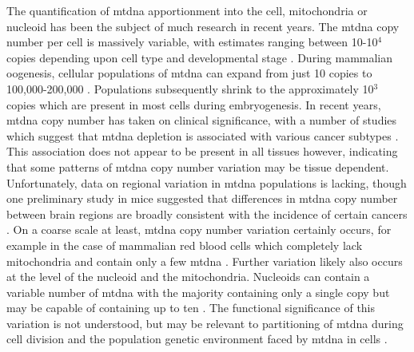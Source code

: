\documentclass[12pt,twoside]{reedthesis}
\begin{document}
The quantification of \gls{mtdna} apportionment into the cell, mitochondria or nucleoid has been the subject of much research in recent years. 
The \gls{mtdna} copy number per cell is massively variable, with estimates ranging between 10-10$^{4}$ copies depending upon cell type and developmental stage \citep{shuster_mitochondrial_1988, white_revealing_2008}.
During mammalian oogenesis, cellular populations of \gls{mtdna} can expand from just 10 copies to 100,000-200,000 \citep{cao_mitochondrial_2007, shoubridge_mitochondrial_2007, white_revealing_2008}.
Populations subsequently shrink to the approximately 10$^{3}$ copies which are present in most cells during embryogenesis.
In recent years, \gls{mtdna} copy number has taken on clinical significance, with a number of studies which suggest that \gls{mtdna} depletion is associated with various cancer subtypes \citep{thyagarajan_mitochondrial_2012, thyagarajan_mitochondrial_2013, zhou_peripheral_2014, el-hattab_mitochondrial_2013}.
This association does not appear to be present in all tissues however, indicating that some patterns of \gls{mtdna} copy number variation may be tissue dependent. 
Unfortunately, data on regional variation in \gls{mtdna} populations is lacking, though one preliminary study in mice suggested that differences in \gls{mtdna} copy number between brain regions are broadly consistent with the incidence of certain cancers \citep{fuke_regional_2011}.
On a coarse scale at least, \gls{mtdna} copy number variation certainly occurs, for example in the case of mammalian red blood cells which completely lack mitochondria and contain only a few \gls{mtdna} \citep{shuster_mitochondrial_1988}.
Further variation likely also occurs at the level of the nucleoid and the mitochondria.
Nucleoids can contain a variable number of \gls{mtdna} with the majority containing only a single copy \citep{kukat_super-resolution_2011} but may be capable of containing up to ten \citep{legros_organization_2004, iborra_functional_2004, brown_superresolution_2011}.
The functional significance of this variation is not understood, but may be relevant to partitioning of \gls{mtdna} during cell division and the population genetic environment faced by \gls{mtdna} in cells \citep{birky_inheritance_2001}.
\end{document}
